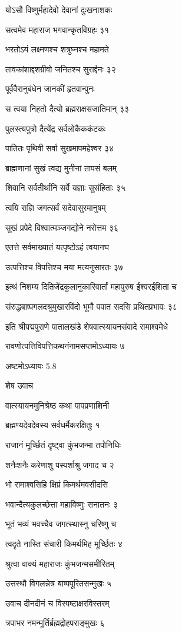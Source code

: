 योऽसौ विष्णुर्महादेवो देवानां दुःखनाशकः

सत्वमेव महाराज भगवान्कृतविग्रहः ३१

भरतोऽयं लक्ष्मणश्च शत्रुघ्नश्च महामते

तावकांशाद्दशग्रीवो जनितश्च सुरार्द्दनः ३२

पूर्ववैरानुबंधेन जानकीं हृतवान्पुनः

स त्वया निहतो दैत्यो ब्रह्मराक्षसजातिमान् ३३

पुलस्त्यपुत्रो दैत्येंद्र सर्वलोकैककंटकः

पातितः पृथिवी सर्वा सुखमापमहेश्वर ३४

ब्राह्मणानां सुखं त्वद्य मुनीनां तापसं बलम्

शिवानि सर्वतीर्थानि सर्वे यज्ञाः सुसंहिताः ३५

त्वयि राज्ञि जगत्सर्वं सदेवासुरमानुषम्

सुखं प्रपेदे विश्वात्मञ्जगद्योने नरोत्तम ३६

एतत्ते सर्वमाख्यातं यत्पृष्टोऽहं त्वयानघ

उत्पत्तिश्च विपत्तिश्च मया मत्यनुसारतः ३७

इत्थं निशम्य दितिजेंद्रकुलानुकारिवार्तां महापुरुष ईश्वरईशिता च

संरुद्धबाष्पगलदश्रुमुखारविंदो भूमौ पपात सदसि प्रथितप्रभावः ३८

इति श्रीपद्मपुराणे पातालखंडे शेषवात्स्यायनसंवादे रामाश्वमेधे

रावणोत्पत्तिविपत्तिकथनंनामसप्तमोऽध्यायः ७

अष्टमोऽध्यायः 5.8

शेष उवाच

वात्स्यायनमुनिश्रेष्ठ कथा पापप्रणाशिनी

ब्रह्मण्यदेवदेवस्य सर्वधर्मैकरक्षितुः १

राजानं मूर्च्छितं दृष्ट्वा कुंभजन्मा तपोनिधिः

शनैःशनैः करेणाशु पस्पर्शाश्रु जगाद च २

भो रामाश्वसिहि क्षिप्रं किमर्थमवसीदसि

भवान्दैत्यकुलच्छेत्ता महाविष्णुः सनातनः ३

भूतं भव्यं भवच्चैव जगत्स्थास्नु चरिष्णु च

त्वदृते नास्ति संचारी किमर्थमिह मूर्च्छितः ४

श्रुत्वा वाक्यं महाराजः कुंभजन्मसमीरितम्

उत्तस्थौ विगलन्नेत्र बाष्पपूरितसन्मुखः ५

उवाच दीनदीनं च विस्पष्टाक्षरविस्तरम्

त्रपाभर नमन्मूर्तिर्ब्रह्मद्रोहपराङ्मुखः ६

